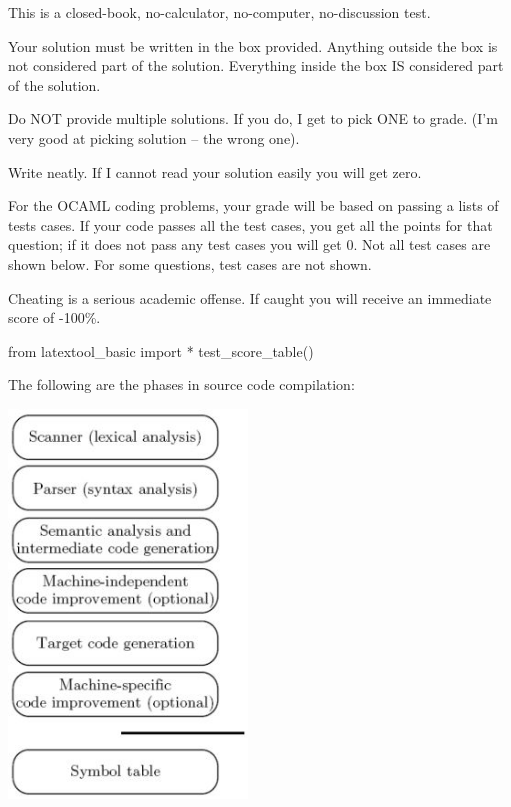 

\renewcommand\AUTHOR{Carl Dalebout} %


\topmattertwo

\begin{enumerate}

\li This is a closed-book, no-calculator, no-computer, no-discussion test.

\li Your solution must be written in the box provided. Anything outside the box
is not considered part of the solution.
Everything inside the box IS considered part of the solution.

\li Do NOT provide multiple solutions. If you do, I get to pick ONE to grade.
(I'm very good at picking solution -- the wrong one).

\li Write neatly. If I cannot read your solution easily you will get zero.

\li
For the OCAML coding problems,
your grade will be based on passing a lists of tests cases.
If your code passes all the test cases,
you get all the points for that question;
if it does not pass any test cases you will get 0.
Not all test cases are shown below.
For some questions, test cases are not shown.

\li 
Cheating is a serious academic offense. If caught you will receive an
immediate score
of -100\%.

\end{enumerate}

\newpage
\begin{python}
from latextool_basic import *
test_score_table()
\end{python}



\newpage
\nextq
The following are the phases in source code compilation:

\begin{center}
\includegraphics[width=2.5in]{pic.JPG}
\end{center}

